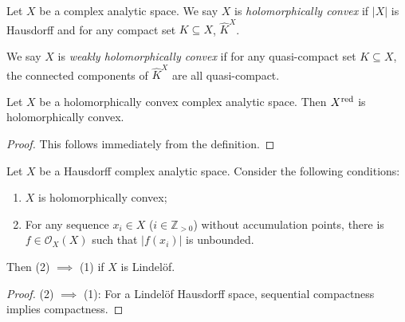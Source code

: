\iffalse
\begin{thm}[Grauert]
    Let $X$ be a holomorphically spreadable complex analytic space. Then there is $n\in \mathbb{N}$ a quasi-finite morphism $f:X\rightarrow \mathbb{C}^n$.
\end{thm}
\begin{proof}
    
\end{proof}
\fi


\begin{definition}
    Let $X$ be a complex analytic space. We say $X$ is \emph{holomorphically convex} if $|X|$ is Hausdorff and for any compact set $K\subseteq X$, $\hat{K}^X$.

    We say $X$ is \emph{weakly holomorphically convex} if for any quasi-compact set $K\subseteq X$, the connected components of $\hat{K}^X$ are all quasi-compact.
\end{definition}

\begin{proposition}
    Let $X$ be a holomorphically convex complex analytic space. Then $X^{\operatorname{red}}$ is holomorphically convex.
\end{proposition}
\begin{proof}
    This follows immediately from the definition.
\end{proof}

\begin{proposition}\label{prop-holoconvchar}
    Let $X$ be a Hausdorff complex analytic space. Consider the following conditions:
    \begin{enumerate}
        \item $X$ is holomorphically convex;
        \item For any sequence $x_i\in X$ ($i\in \mathbb{Z}_{>0}$) without accumulation points, there is $f\in \mathcal{O}_X(X)$ such that $|f(x_i)|$ is unbounded.
    \end{enumerate}
    Then (2) $\implies$ (1) if $X$ is Lindelöf.
\end{proposition}
\begin{proof}
    (2) $\implies$ (1): For a Lindelöf Hausdorff space, sequential compactness implies compactness. 

\end{proof}

